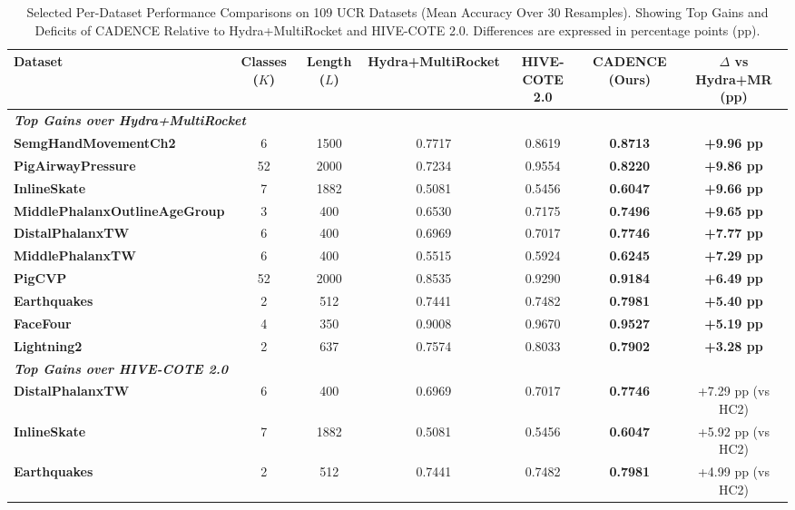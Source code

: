 \begin{table}[t]
\centering
\caption{Selected Per-Dataset Performance Comparisons on 109 UCR Datasets (Mean Accuracy Over 30 Resamples). Showing Top Gains and Deficits of CADENCE Relative to Hydra+MultiRocket and HIVE-COTE 2.0. Differences are expressed in percentage points (pp).}
\label{tab:breakthrough}
\small
\begin{tabular}{lcccccc}
\toprule
\textbf{Dataset} & \textbf{Classes ($K$)} & \textbf{Length ($L$)} & \textbf{Hydra+MultiRocket} & \textbf{HIVE-COTE 2.0} & \textbf{CADENCE (Ours)} & \textbf{$\Delta$ vs Hydra+MR (pp)} \\
\midrule
\multicolumn{7}{l}{\textit{\textbf{Top Gains over Hydra+MultiRocket}}} \\
\textbf{SemgHandMovementCh2} & 6 & 1500 & 0.7717 & 0.8619 & \textbf{0.8713} & \textbf{+9.96 pp} \\
\textbf{PigAirwayPressure} & 52 & 2000 & 0.7234 & 0.9554 & \textbf{0.8220} & \textbf{+9.86 pp} \\
\textbf{InlineSkate} & 7 & 1882 & 0.5081 & 0.5456 & \textbf{0.6047} & \textbf{+9.66 pp} \\
\textbf{MiddlePhalanxOutlineAgeGroup} & 3 & 400 & 0.6530 & 0.7175 & \textbf{0.7496} & \textbf{+9.65 pp} \\
\textbf{DistalPhalanxTW} & 6 & 400 & 0.6969 & 0.7017 & \textbf{0.7746} & \textbf{+7.77 pp} \\
\textbf{MiddlePhalanxTW} & 6 & 400 & 0.5515 & 0.5924 & \textbf{0.6245} & \textbf{+7.29 pp} \\
\textbf{PigCVP} & 52 & 2000 & 0.8535 & 0.9290 & \textbf{0.9184} & \textbf{+6.49 pp} \\
\textbf{Earthquakes} & 2 & 512 & 0.7441 & 0.7482 & \textbf{0.7981} & \textbf{+5.40 pp} \\
\textbf{FaceFour} & 4 & 350 & 0.9008 & 0.9670 & \textbf{0.9527} & \textbf{+5.19 pp} \\
\textbf{Lightning2} & 2 & 637 & 0.7574 & 0.8033 & \textbf{0.7902} & \textbf{+3.28 pp} \\
\midrule
\multicolumn{7}{l}{\textit{\textbf{Top Gains over HIVE-COTE 2.0}}} \\
\textbf{DistalPhalanxTW} & 6 & 400 & 0.6969 & 0.7017 & \textbf{0.7746} & +7.29 pp (vs HC2) \\
\textbf{InlineSkate} & 7 & 1882 & 0.5081 & 0.5456 & \textbf{0.6047} & +5.92 pp (vs HC2) \\
\textbf{Earthquakes} & 2 & 512 & 0.7441 & 0.7482 & \textbf{0.7981} & +4.99 pp (vs HC2) \\

\end{tabular}
\end{table}
